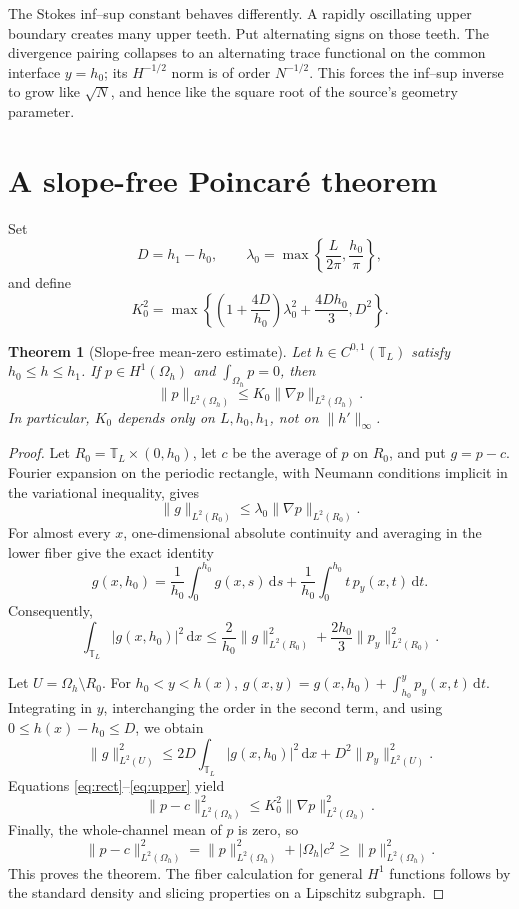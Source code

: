 \documentclass[11pt]{article}
\newtheorem{theorem}{Theorem}
\newcommand{\Om}{\Omega}
\newcommand{\T}{\mathbb T}
\newcommand{\dd}{\,\mathrm d}
\begin{document}
The Stokes inf--sup constant behaves differently.  A rapidly oscillating
upper boundary creates many upper teeth.  Put alternating signs on those
teeth.  The divergence pairing collapses to an alternating trace functional
on the common interface \(y=h_0\); its \(H^{-1/2}\) norm is of order
\(N^{-1/2}\).  This forces the inf--sup inverse to grow like \(\sqrt N\),
and hence like the square root of the source's geometry parameter.

\section{A slope-free Poincar\'e theorem}

Set
\[
 D=h_1-h_0,\qquad
 \lambda_0=\max\left\{\frac{L}{2\pi},\frac{h_0}{\pi}\right\},
\]
and define
\[
 K_0^2=\max\left\{
 \left(1+\frac{4D}{h_0}\right)\lambda_0^2+\frac{4Dh_0}{3},
 D^2\right\}.
\]

\begin{theorem}[Slope-free mean-zero estimate]\label{thm:poincare}
Let \(h\in C^{0,1}(\T_L)\) satisfy \(h_0\le h\le h_1\).  If
\(p\in H^1(\Om_h)\) and \(\int_{\Om_h}p=0\), then
\[
 \|p\|_{L^2(\Om_h)}\le K_0\|\nabla p\|_{L^2(\Om_h)}.
\]
In particular, \(K_0\) depends only on \(L,h_0,h_1\), not on
\(\|h'\|_\infty\).
\end{theorem}

\begin{proof}
Let \(R_0=\T_L\times(0,h_0)\), let \(c\) be the average of \(p\)
on \(R_0\), and put \(g=p-c\).  Fourier expansion on the periodic
rectangle, with Neumann conditions implicit in the variational inequality,
gives
\begin{equation}\label{eq:rect}
 \|g\|_{L^2(R_0)}\le\lambda_0\|\nabla p\|_{L^2(R_0)}.
\end{equation}
For almost every \(x\), one-dimensional absolute continuity and averaging in
the lower fiber give the exact identity
\[
 g(x,h_0)=\frac1{h_0}\int_0^{h_0}g(x,s)\dd s
 +\frac1{h_0}\int_0^{h_0}t\,p_y(x,t)\dd t.
\]
Consequently,
\begin{equation}\label{eq:trace}
 \int_{\T_L}|g(x,h_0)|^2\dd x
 \le \frac2{h_0}\|g\|_{L^2(R_0)}^2
 +\frac{2h_0}{3}\|p_y\|_{L^2(R_0)}^2.
\end{equation}

Let \(U=\Om_h\setminus R_0\).  For \(h_0<y<h(x)\),
\(g(x,y)=g(x,h_0)+\int_{h_0}^y p_y(x,t)\dd t\).  Integrating in
\(y\), interchanging the order in the second term, and using
\(0\le h(x)-h_0\le D\), we obtain
\begin{equation}\label{eq:upper}
 \|g\|_{L^2(U)}^2
 \le 2D\int_{\T_L}|g(x,h_0)|^2\dd x
 +D^2\|p_y\|_{L^2(U)}^2.
\end{equation}
Equations \eqref{eq:rect}--\eqref{eq:upper} yield
\[
 \|p-c\|_{L^2(\Om_h)}^2
 \le K_0^2\|\nabla p\|_{L^2(\Om_h)}^2.
\]
Finally, the whole-channel mean of \(p\) is zero, so
\[
 \|p-c\|_{L^2(\Om_h)}^2
 =\|p\|_{L^2(\Om_h)}^2+|\Om_h|c^2
 \ge \|p\|_{L^2(\Om_h)}^2.
\]
This proves the theorem.  The fiber calculation for general \(H^1\)
functions follows by the standard density and slicing properties on a
Lipschitz subgraph.
\end{proof}
\end{document}
